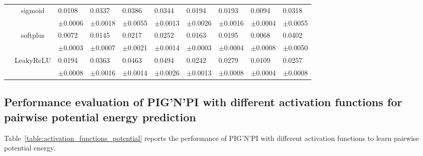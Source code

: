 \documentclass{article}
\newcommand{\pignpi}{PIG'N'PI\xspace}
\begin{document}
\begin{table}[h!]
{\begin{tabularx}{\textwidth}{ccXXXXXXXX}
        & \multirow{2}{*}{sigmoid}
        & 0.0108 & 0.0337 & 0.0386 & 0.0344 & 0.0194 & 0.0193 & 0.0094 & 0.0318\\
        &&\scriptsize $\pm$0.0006 & \scriptsize $\pm$0.0018 & \scriptsize $\pm$0.0055 & \scriptsize $\pm$0.0013 & \scriptsize $\pm$0.0026 & \scriptsize $\pm$0.0016 & \scriptsize $\pm$0.0004 & \scriptsize $\pm$0.0055\\
        \cline{3-10}\rule{0pt}{2.3ex}

        & \multirow{2}{*}{softplus}
        & 0.0072 & 0.0145 & 0.0217 & 0.0252 & 0.0163 & 0.0195 & 0.0068 & 0.0402\\
        &&\scriptsize $\pm$0.0003 & \scriptsize $\pm$0.0007 & \scriptsize $\pm$0.0021 & \scriptsize $\pm$0.0014 & \scriptsize $\pm$0.0003 & \scriptsize $\pm$0.0004 & \scriptsize $\pm$0.0008 & \scriptsize $\pm$0.0050\\
        \cline{3-10}\rule{0pt}{2.3ex}

        & \multirow{2}{*}{LeakyReLU}
        & 0.0194 & 0.0363 & 0.0463 & 0.0494 & 0.0242 & 0.0279 & 0.0109 & 0.0257\\
        &&\scriptsize $\pm$0.0008 & \scriptsize $\pm$0.0016 & \scriptsize $\pm$0.0014 & \scriptsize $\pm$0.0026 & \scriptsize $\pm$0.0013 & \scriptsize $\pm$0.0008 & \scriptsize $\pm$0.0004 & \scriptsize $\pm$0.0008\\

      \bottomrule
\end{tabularx}
}
\end{table}

\clearpage


\subsection{Performance evaluation of \pignpi with different activation functions  for pairwise potential energy prediction}
\label{sec:activation_function_potential}
Table~\ref{table:activation_functions_potential} reports the performance of \pignpi with different activation functions to learn pairwise potential energy.


\begingroup %
\setlength{\LTleft}{0pt minus \textwidth}
\setlength{\LTright}{0pt minus \textwidth}
\setlength{\LTcapwidth}{\textwidth}
\end{document}
